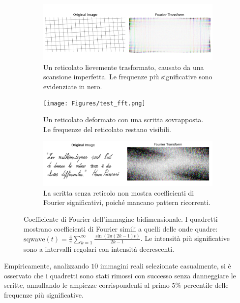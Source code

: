     \begin{figure}
    	\centering
    	\begin{subfigure}[t]{\linewidth}
    		\includegraphics[width=\linewidth]{Figures/grid_fft.png} \caption{Un reticolato lievemente trasformato, causato da una scansione imperfetta. Le frequenze più significative sono evidenziate in nero.} \label{fig:synthetic_grid_fft}
    	\end{subfigure}
    	\begin{subfigure}[t]{\linewidth}
    		\texttt{[image: Figures/test\_fft.png]} \caption{Un reticolato deformato con una scritta sovrapposta. Le frequenze del reticolato restano visibili.} \label{fig:synthetic_sign_fft}
    	\end{subfigure} \begin{subfigure}[t]{\linewidth}
    		\includegraphics[width=\linewidth]{Figures/clean_fft.png} \caption{La scritta senza reticolo non mostra coefficienti di Fourier significativi, poiché mancano pattern ricorrenti.} \label{fig:synthetic_clean_fft}
    	\end{subfigure}
    	\caption[Synthetic FFT test]{Coefficiente di Fourier dell'immagine bidimensionale. I quadretti mostrano coefficienti di Fourier simili a quelli delle onde quadre: $\text{sqwave}(t) = \frac{4}{\pi}\sum_{k=1}^{\infty}\frac{\sin\left(2\pi(2k-1)t\right)}{2k-1}$. Le intensità più significative sono a intervalli regolari con intensità decrescenti.}
    \end{figure}

    \noindent Empiricamente, analizzando $10$ immagini reali selezionate casualmente, si è osservato che i quadretti sono stati rimossi con successo senza danneggiare le scritte, annullando le ampiezze corrispondenti al primo $5\%$ percentile delle frequenze più significative.


